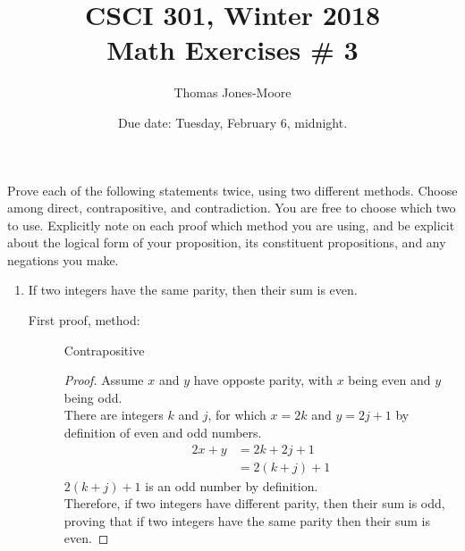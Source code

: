 \documentclass{article}
\title{CSCI 301, Winter 2018\\Math Exercises \# 3}
\author{Thomas Jones-Moore}
\date{Due date:  Tuesday, February 6, midnight.}
\begin{document}
\maketitle

Prove each of the following statements twice, using two different
methods.  Choose among direct, contrapositive, and contradiction.  You
are free to choose which two to use.  Explicitly note on each proof which
method you are using, and be explicit about the logical form of your
proposition, its constituent propositions, and any negations you
make.


\begin{enumerate}
\item If two integers have the same parity, then their sum is even.
  \begin{description}
    \item[First proof, method:] Contrapositive
    \begin{proof} Assume $x$ and $y$ have opposte parity, with $x$ being even and $y$ being odd. \\ There are integers $k$ and $j$, for which $x=2k$ and $y=2j+1$ by definition of even and odd numbers. 
    \begin{alignat*}{2}
    	x+y &= 2k+2j+1 \\
        &=2(k+j)+1
    \end{alignat*}
    $2(k+j)+1$ is an odd number by definition.\\
    Therefore, if two integers have different parity, then their sum is odd, proving that if two integers have the same parity then their sum is even. 
    \end{proof}
    

\end{description}
\end{enumerate}
\end{document}
